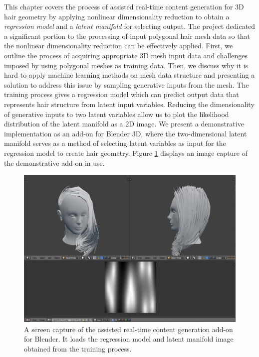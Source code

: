 \documentclass[ %
author={Dillon Keith Diep},
supervisor={Dr. Carl Henrik Ek},
degree={MEng},
title={ART-CG Hair:},
subtitle={Assisted Real-time Content Generation of Stylised Virtual Hair},
type={Research},
year={2017} ]{dissertation}
\begin{document}
	This chapter covers the process of assisted real-time content generation for 3D hair geometry by applying nonlinear dimensionality reduction to obtain a \textit{regression model} and a \textit{latent manifold} for selecting output. The project dedicated a significant portion to the processing of input polygonal hair mesh data so that the nonlinear dimensionality reduction can be effectively applied. First, we outline the process of acquiring appropriate 3D mesh input data and challenges imposed by using polygonal meshes as training data. Then, we discuss why it is hard to apply machine learning methods on mesh data structure and presenting a solution to address this issue by sampling generative inputs from the mesh. The training process gives a regression model which can predict output data that represents hair structure from latent input variables. Reducing the dimensionality of generative inputs to two latent variables allow us to plot the likelihood distribution of the latent manifold as a 2D image. We present a demonstrative implementation as an add-on for Blender 3D, where the two-dimensional latent manifold serves as a method of selecting latent variables as input for the regression model to create hair geometry. Figure \ref{latentAddon} displays an image capture of the demonstrative add-on in use.
	
	\begin{figure}[!h]
		\centering
		\includegraphics[scale=0.3]{images/latentHairAddon}
		\caption{A screen capture of the assisted real-time content generation add-on for Blender. It loads the regression model and latent manifold image obtained from the training process.}
		\label{latentAddon}
	\end{figure}
	
\end{document}

